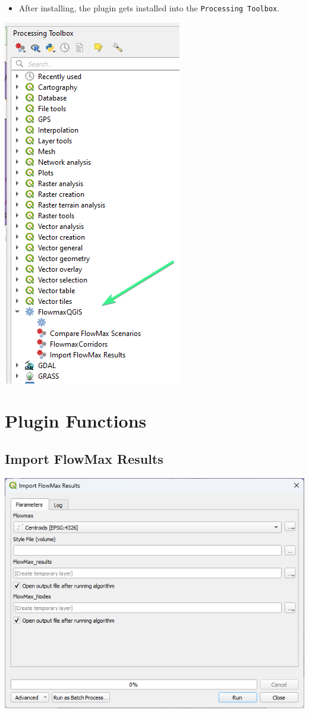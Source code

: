 \documentclass[
]{book}
\providecommand{\tightlist}{%
  \setlength{\itemsep}{0pt}\setlength{\parskip}{0pt}}
\begin{document}
\begin{itemize}
\tightlist
\item
  After installing, the plugin gets installed into the \texttt{Processing\ Toolbox}.
\end{itemize}

\includegraphics{./images/processing.png}

\chapter{Plugin Functions}\label{plugin-functions}

\section{Import FlowMax Results}\label{import-flowmax-results}

\includegraphics{./images/import.png}
\end{document}
